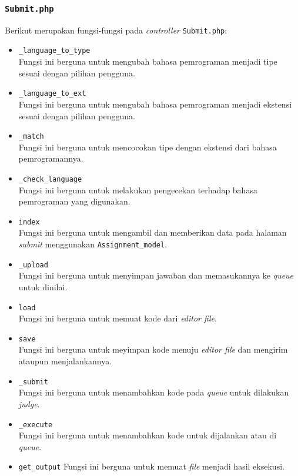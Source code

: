 \subsubsection{\texttt{Submit.php}}
Berikut merupakan fungsi-fungsi pada \textit{controller} \texttt{Submit.php}:
\begin{itemize}
	\item \texttt{\_language\_to\_type}\\
	Fungsi ini berguna untuk mengubah bahasa pemrograman menjadi tipe sesuai dengan pilihan pengguna.
	\item \texttt{\_language\_to\_ext}\\
	Fungsi ini berguna untuk mengubah bahasa pemrograman menjadi ekstensi sesuai dengan pilihan pengguna.
	\item \texttt{\_match}\\
	Fungsi ini berguna untuk mencocokan tipe dengan ekstensi dari bahasa pemrogramannya.
	\item \texttt{\_check\_language}\\
	Fungsi ini berguna untuk melakukan pengecekan terhadap bahasa pemrograman yang digunakan.
	\item \texttt{index}\\
	Fungsi ini berguna untuk mengambil dan memberikan data pada halaman \textit{submit} menggunakan \texttt{Assignment\_model}. 
	\item \texttt{\_upload}\\
	Fungsi ini berguna untuk menyimpan jawaban dan memasukannya ke \textit{queue} untuk dinilai.
	\item \texttt{load}\\
	Fungsi ini berguna untuk memuat kode dari \textit{editor file}.
	\item \texttt{save}\\
	Fungsi ini berguna untuk meyimpan kode menuju \textit{editor file} dan mengirim ataupun menjalankannya.
	\item \texttt{\_submit}\\
	Fungsi ini berguna untuk menambahkan kode pada \textit{queue} untuk dilakukan \textit{judge}.
	\item \texttt{\_execute}\\
	Fungsi ini berguna untuk menambahkan kode untuk dijalankan atau di \textit{queue}.
	\item \texttt{get\_output}
	Fungsi ini berguna untuk memuat \textit{file} menjadi hasil eksekusi.
\end{itemize}
